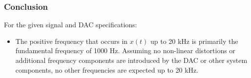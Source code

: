 \subsubsection{Conclusion}
For the given signal and DAC specifications:
\begin{itemize}
    \item The positive frequency that occurs in $x(t)$ up to 20 kHz is primarily the fundamental frequency of 1000 Hz. Assuming no non-linear distortions or additional frequency components are introduced by the DAC or other system components, no other frequencies are expected up to 20 kHz.
\end{itemize}
